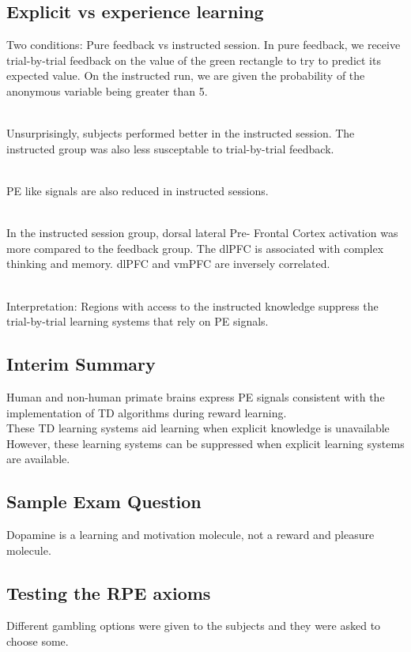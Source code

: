 \subsection{Explicit vs experience learning}
Two conditions: Pure feedback vs instructed session. In pure feedback, we receive trial-by-trial feedback on the value of the green rectangle to try to predict its expected value. On the instructed run, we are given the probability of the anonymous variable being greater than 5. 

\\Unsurprisingly, subjects performed better in the instructed session. The instructed group was also less susceptable to trial-by-trial feedback.

\\PE like signals are also reduced in instructed sessions.

\\In the instructed session group, dorsal lateral Pre- Frontal Cortex activation was more compared to the feedback group. The dlPFC is associated with complex thinking and memory. dlPFC and vmPFC are inversely correlated.

\\Interpretation: Regions with access to the instructed knowledge suppress the trial-by-trial learning systems that rely on PE signals.

\subsection{Interim Summary}
Human and non-human primate brains express PE signals consistent with the implementation of TD algorithms during reward learning.
\\These TD learning systems aid learning when explicit knowledge is unavailable
\\However, these learning systems can be suppressed when explicit learning systems are available.

\subsection{Sample Exam Question}
Dopamine is a learning and motivation molecule, not a reward and pleasure molecule.

\subsection{Testing the RPE axioms}
Different gambling options were given to the subjects and they were asked to choose some.

